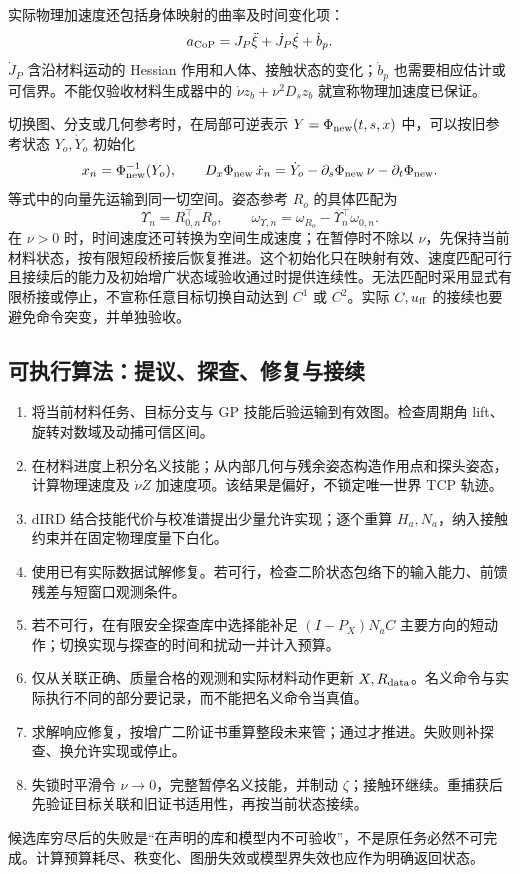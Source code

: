 \documentclass[11pt,a4paper]{article}
\numberwithin{equation}{section}
\theoremstyle{definition}
\begin{document}
实际物理加速度还包括身体映射的曲率及时间变化项：
\begin{equation}
 a_{\rm CoP}=J_P\ddot\xi+\dot J_P\dot\xi+\dot b_p.
\end{equation}
$\dot J_P$ 含沿材料运动的 Hessian 作用和人体、接触状态的变化；$\dot b_p$ 也需要相应估计或可信界。不能仅验收材料生成器中的 $\dot\nu z_b+\nu^2D_sz_b$ 就宣称物理加速度已保证。

切换图、分支或几何参考时，在局部可逆表示 $Y=\Phi_{\rm new}(t,s,x)$ 中，可以按旧参考状态 $Y_o,\dot Y_o$ 初始化
\begin{equation}
 x_n=\Phi_{\rm new}^{-1}(Y_o),\qquad
 D_x\Phi_{\rm new}\,\dot x_n
 =\dot Y_o-\partial_s\Phi_{\rm new}\,\nu-\partial_t\Phi_{\rm new}.
\end{equation}
等式中的向量先运输到同一切空间。姿态参考 $R_o$ 的具体匹配为
\begin{equation}
 \Upsilon_n=R_{0,n}^\top R_o,\qquad
 \omega_{\Upsilon,n}=\omega_{R_o}-\Upsilon_n^\top\omega_{0,n}.
\end{equation}
在 $\nu>0$ 时，时间速度还可转换为空间生成速度；在暂停时不除以 $\nu$，先保持当前材料状态，按有限短段桥接后恢复推进。这个初始化只在映射有效、速度匹配可行且接续后的能力及初始增广状态域验收通过时提供连续性。无法匹配时采用显式有限桥接或停止，不宣称任意目标切换自动达到 $C^1$ 或 $C^2$。实际 $C,u_{\rm ff}$ 的接续也要避免命令突变，并单独验收。

\subsection{可执行算法：提议、探查、修复与接续}
\begin{enumerate}
 \item 将当前材料任务、目标分支与 GP 技能后验运输到有效图。检查周期角 lift、旋转对数域及动捕可信区间。
 \item 在材料进度上积分名义技能；从内部几何与残余姿态构造作用点和探头姿态，计算物理速度及 $\dot\nu Z$ 加速度项。该结果是偏好，不锁定唯一世界 TCP 轨迹。
 \item dIRD 结合技能代价与校准谱提出少量允许实现；逐个重算 $H_a,N_a$，纳入接触约束并在固定物理度量下白化。
 \item 使用已有实际数据试解修复。若可行，检查二阶状态包络下的输入能力、前馈残差与短窗口观测条件。
 \item 若不可行，在有限安全探查库中选择能补足 $(I-P_X)N_aC$ 主要方向的短动作；切换实现与探查的时间和扰动一并计入预算。
 \item 仅从关联正确、质量合格的观测和实际材料动作更新 $X,R_{\rm data}$。名义命令与实际执行不同的部分要记录，而不能把名义命令当真值。
 \item 求解响应修复，按增广二阶证书重算整段未来管；通过才推进。失败则补探查、换允许实现或停止。
 \item 失锁时平滑令 $\nu\to0$，完整暂停名义技能，并制动 $\zeta$；接触环继续。重捕获后先验证目标关联和旧证书适用性，再按当前状态接续。
\end{enumerate}
候选库穷尽后的失败是“在声明的库和模型内不可验收”，不是原任务必然不可完成。计算预算耗尽、秩变化、图册失效或模型界失效也应作为明确返回状态。
\end{document}
